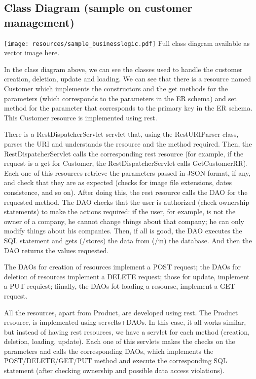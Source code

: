 \subsection{Class Diagram (sample on customer management)}


\texttt{[image: resources/sample\_businesslogic.pdf]}
Full class diagram available as vector image \href{https://drive.google.com/file/d/1cTR0OGGH9rbpp6zuY7K3tNlbGnMKxU8j/view?usp=share_link}{here}.

\pagebreak

 
In the class diagram above, we can see the classes used to handle the customer creation, deletion, update and loading. We can see that there is a resource named Customer which implements the constructors and the get methods for the parameters (which corresponds to the parameters in the ER schema) and set method for the parameter that corresponds to the primary key in the ER schema. This Customer resource is implemented using rest. 

There is a RestDispatcherServlet servlet that, using the RestURIParser class, parses the URI and understands the resource and the method required. Then, the RestDispatcherServlet calls the corresponding rest resource (for example, if the request is a get for Customer, the RestDispatcherServlet calls GetCustomerRR). Each one of this resources retrieve the parameters passed in JSON format, if any, and check that they are as expected (checks for image file extensions, dates consistence, and so on). After doing this, the rest resource calls the DAO for the requested method. The DAO checks that the user is authorized (check ownership statements) to make the actions required: if the user, for example, is not the owner of a company, he cannot change things about that company; he can only modify things about his companies. Then, if all is good, the DAO executes the SQL statement and gets (/stores) the data from (/in) the database. And then the DAO returns the values requested.

The DAOs for creation of resources implement a POST request; the DAOs for deletion of resources implement a DELETE request; those for update, implement a PUT requiest; fiinally, the DAOs fot loading a resourse, implement a GET request.

\vspace{0.5 cm}

All the resources, apart from Product, are developed using rest. 
The Product resource, is implemented using servelts+DAOs. In this case, it all works similar, but instead of having rest resources, we have a servlet for each method (creation, deletion, loading, update). Each one of this servlets makes the checks on the parameters and calls the corresponding DAOs, which implements the POST/DELETE/GET/PUT method and execute the corresponding SQL statement (after checking ownership and possible data access violations).
